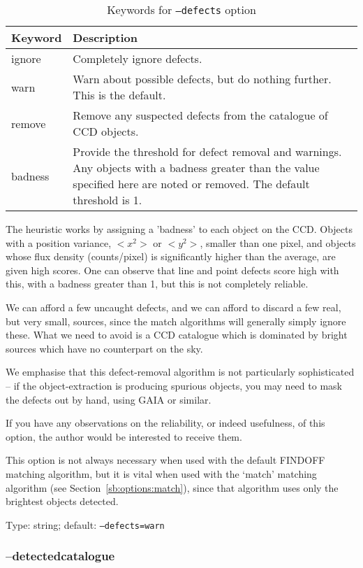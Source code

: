 \documentclass[twoside,11pt]{article}
\newcommand{\xlabel}[1]{}
\begin{document}
\begin{table}
\begin{center}
\begin{tabular}{l|p{10cm}}
Keyword & Description \\ \hline
ignore & Completely ignore defects. \\
warn & Warn about possible defects, but do nothing further. This is the
default. \\
remove & Remove any suspected defects from the catalogue of CCD objects. \\
badness & Provide the threshold for defect removal and warnings. Any objects
with a badness greater than the value specified here are noted or removed. The
default threshold is 1.
\end{tabular}
\end{center}
\caption{\label{tab:defects}Keywords for \texttt{--defects} option}
\end{table}

The heuristic works by assigning a 'badness' to each object on the CCD.
Objects with a position variance, $<x^2>$ or $<y^2>$, smaller than one pixel,
and objects whose flux density (counts/pixel) is significantly higher than the
average, are given high scores.  One can observe that line and point defects
score high with this, with a badness greater than 1, but this is not
completely reliable.

We can afford a few uncaught defects, and we can afford to discard a few real,
but very small, sources, since the match algorithms will generally simply
ignore these.  What we need to avoid is a CCD catalogue which is dominated by
bright sources which have no counterpart on the sky.

We emphasise that this defect-removal algorithm is not particularly
sophisticated -- if the object-extraction is producing spurious objects, you
may need to mask the defects out by hand, using GAIA or similar.

If you have any observations on the reliability, or indeed usefulness, of this
option, the author would be interested to receive them.
            
This option is not always necessary when used with the default FINDOFF
matching algorithm, but it is vital when used with the `match' matching
algorithm (see Section~\ref{sb:options:match}), since that algorithm uses only
the brightest objects detected.

Type: string; default: \texttt{--defects=warn}

\subsubsection{\xlabel{sb_options_detectedcatalogue}--detectedcatalogue\label{sb:options:detectedcatalogue}}
\end{document}
